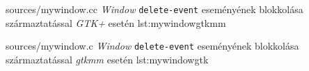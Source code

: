{sources/mywindow.cc}
{\textit{Window} \texttt{delete-event} eseményének blokkolása származtatással \textit{GTK+} esetén}
{lst:mywindowgtkmm}

{sources/mywindow.c}
{\textit{Window} \texttt{delete-event} eseményének blokkolása származtatással \textit{gtkmm} esetén}
{lst:mywindowgtk}

